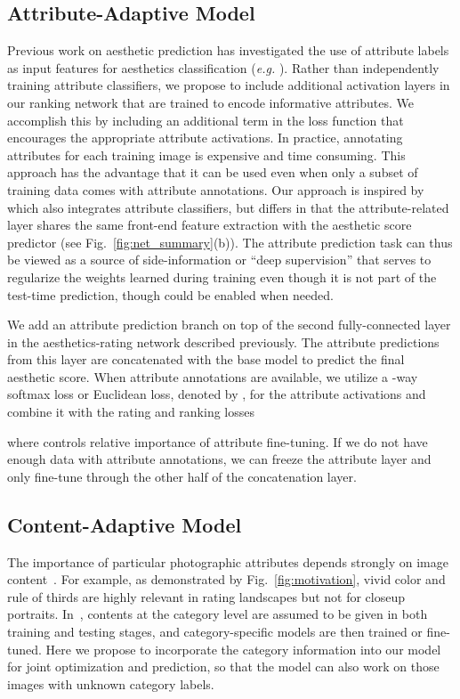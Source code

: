 \documentclass[runningheads]{llncs}
\def\eg{\emph{e.g. }}
\begin{document}
\subsection{Attribute-Adaptive Model}
\label{ssec:attributeNet}
Previous work on aesthetic prediction has investigated the use of attribute
labels as input features for aesthetics classification (\eg \cite{dhar2011high}).
Rather than independently training attribute classifiers,
we propose to include
additional activation layers in our ranking network that are trained to encode
informative attributes.
We accomplish this by including an additional term in
the loss function that encourages the appropriate attribute activations.  In
practice, annotating attributes for each training image is expensive and time
consuming.  This approach has the advantage that it can be used even when
only a subset of training data comes with attribute annotations.  Our approach
is inspired by~\cite{lu2014rapid} which also integrates attribute classifiers,
but differs in that the attribute-related layer shares the same front-end
feature extraction with the aesthetic score predictor (see
Fig.~\ref{fig:net_summary}(b)). The attribute prediction task can thus be
viewed as a source of side-information or ``deep supervision''
\cite{zhuowentuAISTATSpaper} that serves to regularize the weights learned
during training even though it is not part of the test-time prediction,
though could be enabled when needed.

We add an attribute prediction branch on top of the second fully-connected
layer in the aesthetics-rating network described previously. The attribute
predictions from this layer are concatenated with the base model to predict
the final aesthetic score.  When attribute annotations are available, we
utilize a -way softmax loss or Euclidean loss, denoted by , for the attribute
activations and combine it with the rating and ranking losses

where  controls relative importance of attribute fine-tuning.
If we do not have enough data with attribute annotations, we can freeze the
attribute layer and only fine-tune through the other half of the concatenation
layer.

\subsection{Content-Adaptive Model}
\label{ssec:contentNet}
The importance of particular photographic attributes depends strongly on image
content~\cite{luo2011content}.  For example, as demonstrated by Fig.~\ref{fig:motivation},
vivid color and rule of thirds are highly
relevant in rating landscapes but not for closeup portraits.
In~\cite{murray2012ava,xin2015TMM}, contents at the category level are assumed to
be given in both training and testing stages, and category-specific models are
then trained or fine-tuned.
Here we propose to incorporate the category information into our model for joint optimization and prediction,
so that the model can also work on those images with unknown category labels.
\end{document}

